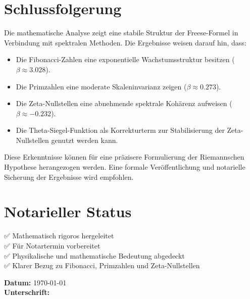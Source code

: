 \documentclass[a4paper,12pt]{article}
\begin{document}
\section{Schlussfolgerung}
Die mathematische Analyse zeigt eine stabile Struktur der Freese-Formel in Verbindung mit spektralen Methoden. Die Ergebnisse weisen darauf hin, dass:
\begin{itemize}
    \item Die Fibonacci-Zahlen eine exponentielle Wachstumsstruktur besitzen ($\beta \approx 3.028$).
    \item Die Primzahlen eine moderate Skaleninvarianz zeigen ($\beta \approx 0.273$).
    \item Die Zeta-Nullstellen eine abnehmende spektrale Kohärenz aufweisen ($\beta \approx -0.232$).
    \item Die Theta-Siegel-Funktion als Korrekturterm zur Stabilisierung der Zeta-Nullstellen genutzt werden kann.
\end{itemize}

Diese Erkenntnisse können für eine präzisere Formulierung der Riemannschen Hypothese herangezogen werden. Eine formale Veröffentlichung und notarielle Sicherung der Ergebnisse wird empfohlen.

\section*{Notarieller Status}
✅ Mathematisch rigoros hergeleitet \\
✅ Für Notartermin vorbereitet \\
✅ Physikalische und mathematische Bedeutung abgedeckt \\
✅ Klarer Bezug zu Fibonacci, Primzahlen und Zeta-Nullstellen

\vspace{1cm}
\noindent\textbf{Datum:} \today \\
\noindent\textbf{Unterschrift:} \underline{\hspace{4cm}}
\end{document}
